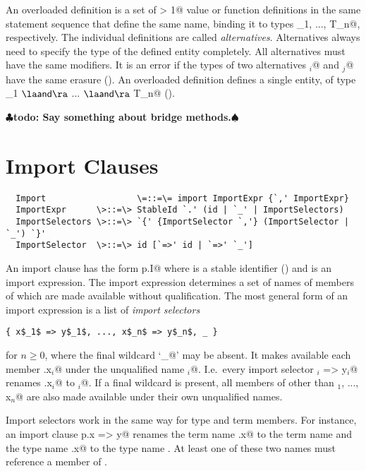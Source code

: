 \documentclass[11pt]{report}
\renewcommand{\todo}[1]{{$\clubsuit$\bf todo: #1$\spadesuit$}}
\begin{document}
An overloaded definition is a set of \verb@n > 1@ value or function
definitions in the same statement sequence that define the same name,
binding it to types \verb@T_1, ..., T_n@, respectively.  The
individual definitions are called {\em alternatives}.  Alternatives
always need to specify the type of the defined entity completely.  All
alternatives must have the same modifiers. It is an error if the types
of two alternatives \verb@T$_i$@ and \verb@T$_j$@ have the same
erasure ().  An overloaded definition defines a
single entity, of type \verb@T_1 $\overload$ ... $\overload$ T_n@
().

\todo{Say something about bridge methods.}

\section{Import Clauses}
\label{sec:import}

\syntax\begin{verbatim}
  Import                  \=::=\= import ImportExpr {`,' ImportExpr}
  ImportExpr      \>::=\> StableId `.' (id | `_' | ImportSelectors)
  ImportSelectors \>::=\> `{' {ImportSelector `,'} (ImportSelector | `_') `}'
  ImportSelector  \>::=\> id [`=>' id | `=>' `_']
\end{verbatim}

An import clause has the form \verb@import p.I@ where \verb@p@ is a stable
identifier () and \verb@I@ is an import expression.
The import expression determines a set of names of members of \verb@p@
which are made available without qualification. The most general form
of an import expression is a list of {\em import selectors}
\begin{verbatim}
{ x$_1$ => y$_1$, ..., x$_n$ => y$_n$, _ }
\end{verbatim}
for $n \geq 0$, where the final wildcard `\verb@_@' may be absent.  It
makes available each member \verb@p.x$_i$@ under the unqualified name
\verb@y$_i$@. I.e.\ every import selector \verb@x$_i$ => y$_i$@ renames
\verb@p.x$_i$@ to
\verb@y$_i$@.  If a final wildcard is present, all members \verb@z@ of
\verb@p@ other than \verb@x$_1$, ..., x$_n$@ are also made available
under their own unqualified names.

Import selectors work in the same way for type and term members. For
instance, an import clause \verb@import p.{x => y}@ renames the term
name \verb@p.x@ to the term name \verb@y@ and the type name \verb@p.x@
to the type name \verb@y@. At least one of these two names must
reference a member of \verb@p@.
\end{document}
